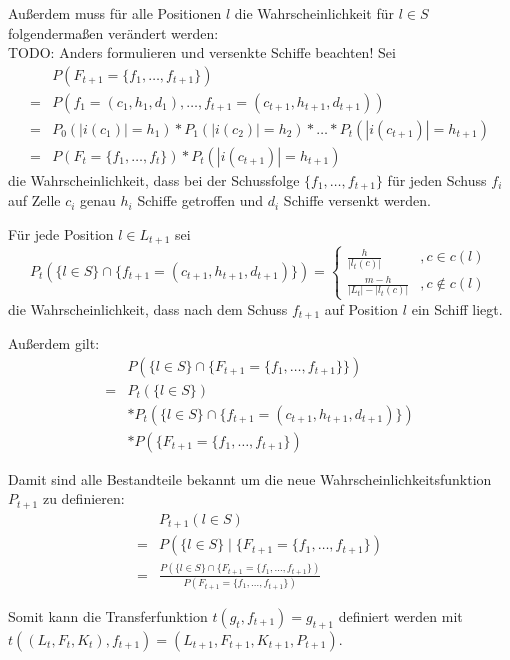 \documentclass[a4paper,12pt]{llncs}
\numberwithin{equation}{section}
\begin{document}
Außerdem muss für alle Positionen $l$ die Wahrscheinlichkeit für $l \in S$ folgendermaßen verändert werden:
\\
TODO: Anders formulieren und versenkte Schiffe beachten!
Sei
\begin{align}
&P(F_{t+1}=\{f_1, \dots, f_{t+1}\}) \\
= &P(f_1=(c_1, h_1, d_1), \dots, f_{t+1}=(c_{t+1}, h_{t+1}, d_{t+1})) \\
= &P_0(|i(c_1)|=h_1) * P_1(|i(c_2)|=h_2) * \dots * P_t(|i(c_{t+1})|=h_{t+1}) \\
= &P(F_{t}=\{f_1, \dots, f_{t}\}) * P_t(|i(c_{t+1})|=h_{t+1})
\end{align}
die Wahrscheinlichkeit, dass bei der Schussfolge $\{f_1, \dots, f_{t+1}\}$ für jeden Schuss $f_i$ auf Zelle $c_i$ genau $h_i$ Schiffe getroffen und $d_i$ Schiffe versenkt werden.

Für jede Position $l \in L_{t+1}$ sei
\[
P_t(\{l \in S\} \cap \{f_{t+1}=(c_{t+1}, h_{t+1}, d_{t+1})\})=
\begin{cases} 
      \frac{h}{|l_t(c)|} &, c \in c(l) \\
      \frac{m-h}{|L_t|-|l_t(c)|} &, c \notin c(l)
\end{cases}
\]
die Wahrscheinlichkeit, dass nach dem Schuss $f_{t+1}$ auf Position $l$ ein Schiff liegt.

Außerdem gilt:
\begin{align}
&P(\{l \in S\} \cap \{F_{t+1}=\{f_1, \dots, f_{t+1}\}\}) \\
=&P_t(\{l \in S\}) \\
&* P_t(\{l \in S \} \cap \{f_{t+1}=(c_{t+1}, h_{t+1}, d_{t+1})\}) \\
&* P(\{F_{t+1}=\{f_1, \dots, f_{t+1}\})
\end{align}

Damit sind alle Bestandteile bekannt um die neue Wahrscheinlichkeitsfunktion $P_{t+1}$ zu definieren:
\begin{align}
&P_{t+1}(l \in S) \\
=&P(\{l \in S\} \mid \{F_{t+1}=\{f_1, \dots, f_{t+1}\}) \\
=&\frac{P(\{l \in S\} \cap \{F_{t+1}=\{f_1, \dots, f_{t+1}\})}{P(F_{t+1}=\{f_1, \dots, f_{t+1}\})}
\end{align}

Somit kann die Transferfunktion $t(g_t, f_{t+1})=g_{t+1}$ definiert werden mit $t((L_t, F_t, K_t), f_{t+1})=(L_{t+1}, F_{t+1}, K_{t+1},P_{t+1})$.

\newpage

 

\end{document}
